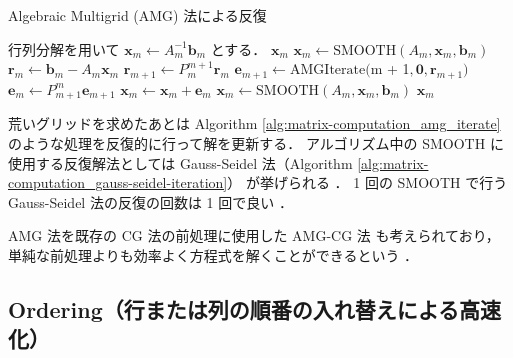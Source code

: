 \begin{algorithm}[tp]
    \caption{Algebraic Multigrid (AMG) 法による反復 \cite{Wolters2002}}
    \label{alg:matrix-computation_amg_iterate}
    \begin{algorithmic}[1]
        \State 行列分解を用いて $\bm{x}_m \gets A_m^{-1} \bm{b}_m$ とする．
        \State \Return $\bm{x}_m$
        \EndIf
        \State $\bm{x}_m \gets \mathrm{SMOOTH}(A_m, \bm{x}_m, \bm{b}_m)$
        \State $\bm{r}_m \gets \bm{b}_m - A_m \bm{x}_m$
        \State $\bm{r}_{m+1} \gets P_{m}^{m+1} \bm{r}_m$
        \State $\bm{e}_{m+1} \gets \mathrm{AMGIterate}($m + 1$, \bm{0}, \bm{r}_{m+1})$
        \State $\bm{e}_m \gets P_{m+1}^{m} \bm{e}_{m+1}$
        \State $\bm{x}_m \gets \bm{x}_m + \bm{e}_m$
        \State $\bm{x}_m \gets \mathrm{SMOOTH}(A_m, \bm{x}_m, \bm{b}_m)$
        \State \Return $\bm{x}_m$
        \EndProcedure
    \end{algorithmic}
\end{algorithm}

荒いグリッドを求めたあとは
Algorithm \ref{alg:matrix-computation_amg_iterate}
のような処理を反復的に行って解を更新する．
アルゴリズム中の SMOOTH に使用する反復解法としては
Gauss-Seidel 法（Algorithm \ref{alg:matrix-computation_gauss-seidel-iteration}）
が挙げられる
\cite{Ruge1987,Wolters2002}．
1 回の SMOOTH で行う Gauss-Seidel 法の反復の回数は 1 回で良い
\cite{Wolters2002}．

AMG 法を既存の CG 法の前処理に使用した AMG-CG 法
も考えられており，
単純な前処理よりも効率よく方程式を解くことができるという
\cite{Wolters2002}．

\clearpage

\subsection{Ordering（行または列の順番の入れ替えによる高速化）}

